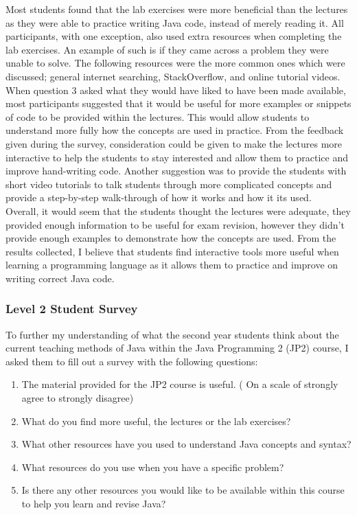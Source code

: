 \documentclass{article}
\begin{document}
Most students found that the lab exercises were more beneficial than the lectures as they were able to practice writing Java code, instead of merely reading it. All participants, with one exception, also used extra resources when completing the lab exercises. An example of such is if they came across a problem they were unable to solve. The following resources were the more common ones which were discussed; general internet searching, StackOverflow, and online tutorial videos.\\

When question 3 asked what they would have liked to have been made available, most participants suggested that it would be useful for more examples or snippets of code to be provided within the lectures. This would allow students to understand more fully how the concepts are used in practice. From the feedback given during the survey, consideration could be given to make the lectures more interactive to help the students to stay interested and allow them to practice and improve hand-writing code. Another suggestion was to provide the students with short video tutorials to talk students through more complicated concepts and provide a step-by-step walk-through of how it works and how it its used.\\

Overall, it would seem that the students thought the lectures were adequate, they provided enough information to be useful for exam revision, however they didn't provide enough examples to demonstrate how the concepts are used. From the results collected, I believe that students find interactive tools more useful when learning a programming language as it allows them to practice and improve on writing correct Java code.\\

\subsubsection{Level 2 Student Survey}

To further my understanding of what the second year students think about the current teaching methods of Java within the Java Programming 2 (JP2) course, I asked them to fill out a survey with the following questions:

\begin{enumerate}
\item The material provided for the JP2 course is useful. ( On a scale of strongly agree to strongly disagree)
\item What do you find more useful, the lectures or the lab exercises?
\item What other resources have you used to understand Java concepts and syntax?
\item What resources do you use when you have a specific problem?
\item Is there any other resources you would like to be available within this course to help you learn and revise Java?
\end{enumerate}
\end{document}
